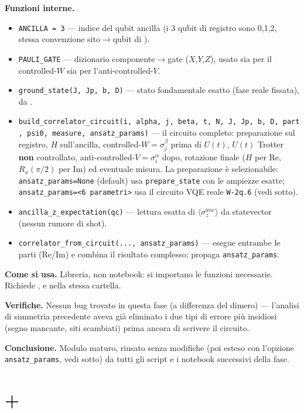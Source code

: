 \documentclass[11pt,a4paper]{article}
\begin{document}
\textbf{Funzioni interne.}
\begin{itemize}
\item \texttt{ANCILLA = 3} — indice del qubit ancilla (i 3 qubit di registro sono
0,1,2, stessa convenzione sito$\to$qubit di \texttt{}).
\item \texttt{PAULI\_GATE} — dizionario componente$\to$gate ($X$,$Y$,$Z$), usato sia
per il controlled-$W$ sia per l'anti-controlled-$V$.
\item \texttt{ground\_state(J,\ Jp,\ b,\ D)} — stato fondamentale esatto (fase reale
fissata), da \texttt{}.
\item \texttt{build\_correlator\_circuit(i,\ alpha,\ j,\ beta,\ t,\ N,\ J,\ Jp,\ b,\
D,\ part,\ psi0,\ measure,\ ansatz\_params)} — il circuito completo: preparazione sul
registro, $H$ sull'ancilla, controlled-$W=\sigma_j^\beta$ prima di $U(t)$, $U(t)$
Trotter \textbf{non} controllato, anti-controlled-$V=\sigma_i^\alpha$ dopo,
rotazione finale ($H$ per Re, $R_x(\pi/2)$ per Im) ed eventuale misura. La
preparazione è selezionabile: \texttt{ansatz\_params=None} (default) usa
\texttt{prepare\_state} con le ampiezze esatte; \texttt{ansatz\_params=<6 parametri>}
usa il circuito VQE reale \texttt{W-2q.6} (vedi sotto).
\item \texttt{ancilla\_z\_expectation(qc)} — lettura esatta di
$\langle\sigma_z^{anc}\rangle$ da statevector (nessun rumore di shot).
\item \texttt{correlator\_from\_circuit(...,\ ansatz\_params)} — esegue entrambe le
parti (Re/Im) e combina il risultato complesso; propaga \texttt{ansatz\_params}.
\end{itemize}

\textbf{Come si usa.} Libreria, non notebook: si importano le funzioni necessarie.
Richiede \texttt{\seqsplit{trimer\_ring\_exact.py}},
\texttt{} e
\texttt{} nella stessa cartella.

\textbf{Verifiche.} Nessun bug trovato in questa fase (a differenza del dimero) —
l'analisi di simmetria precedente aveva già eliminato i due tipi di errore più
insidiosi (segno mancante, siti scambiati) prima ancora di scrivere il circuito.

\textbf{Conclusione.} Modulo maturo, riusato senza modifiche (poi esteso con
l'opzione \texttt{ansatz\_params}, vedi sotto) da tutti gli script e i notebook
successivi della fase.

\section*{\texttt{} + \texttt{}}
\end{document}
